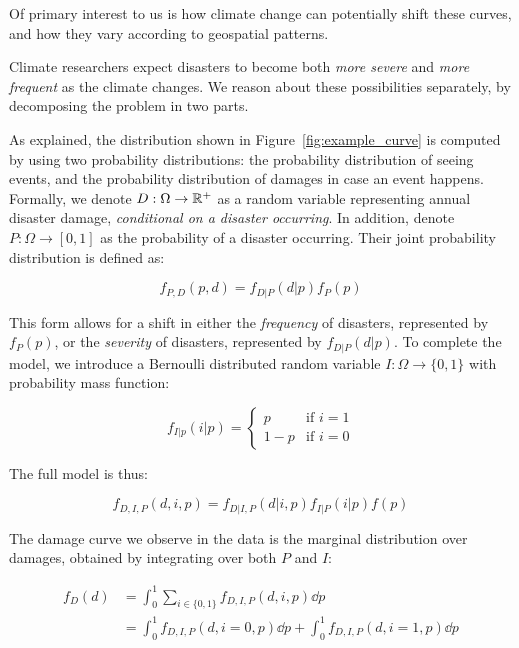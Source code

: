 Of primary interest to us is how climate change can potentially shift these curves, and how they vary according to geospatial patterns.

Climate researchers expect disasters to become both \textit{more severe} and \textit{more frequent} as the climate changes. We reason about these possibilities separately, by decomposing the problem in two parts.

As explained, the distribution shown in Figure~\ref{fig:example_curve} is computed by using two probability distributions: the probability distribution of seeing events, and the probability distribution of damages in case an event happens. Formally, we denote $D: \Omega \rightarrow \mathbb{R}^+$ as a random variable representing annual disaster damage, \textit{conditional on a disaster occurring}. In addition, denote $P: \Omega \rightarrow [0, 1]$ as the probability of a disaster occurring. Their joint probability distribution is defined as:

\begin{equation}
f_{P,D}(p,d) = f_{D|P}(d|p) f_P(p)
\end{equation}

This form allows for a shift in either the \textit{frequency} of disasters, represented by $f_P(p)$, or the \textit{severity} of disasters, represented by $f_{D|P}(d|p)$. To complete the model, we introduce a Bernoulli distributed random variable $I: \Omega \rightarrow \{0, 1\}$ with probability mass function:

\begin{equation}
f_{I|p}(i|p) = \begin{cases} p & \text{if } i = 1 \\ 1 - p & \text{if } i = 0 \end{cases}
\end{equation}

The full model is thus:

\begin{equation}
f_{D, I, P}(d, i, p) = f_{D|I, P}(d|i, p) f_{I|P}(i|p) f(p)
\end{equation}

The damage curve we observe in the data is the marginal distribution over damages, obtained by integrating over both $P$ and $I$:

\begin{align}
f_D(d) &= \int_0^1 \sum_{i \in \{0, 1\}} f_{D, I, P}(d, i, p) \dd p \\
&= \int_0^1 f_{D, I, P}(d, i=0, p) \dd p + \int_0^1 f_{D, I, P}(d, i=1, p) \dd p
\end{align}


